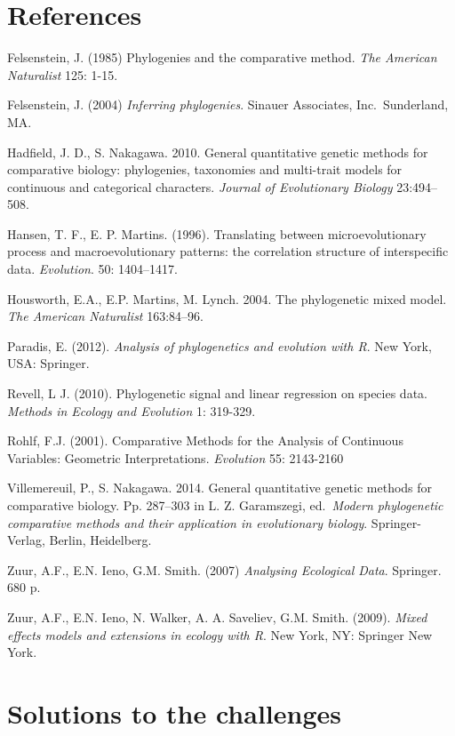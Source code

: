\documentclass[
]{book}
\begin{document}
\hypertarget{references}{%
\chapter{References}\label{references}}

Felsenstein, J. (1985) Phylogenies and the comparative method. \emph{The American Naturalist} 125: 1-15.

Felsenstein, J. (2004) \emph{Inferring phylogenies}. Sinauer Associates, Inc.~Sunderland, MA.

Hadfield, J. D., S. Nakagawa. 2010. General quantitative genetic methods for comparative biology: phylogenies, taxonomies and multi-trait models for continuous and categorical characters. \emph{Journal of Evolutionary Biology} 23:494--508.

Hansen, T. F., E. P. Martins. (1996). Translating between microevolutionary process and macroevolutionary patterns: the correlation structure of interspecific data. \emph{Evolution}. 50: 1404--1417.

Housworth, E.A., E.P. Martins, M. Lynch. 2004. The phylogenetic mixed model. \emph{The American Naturalist} 163:84--96.

Paradis, E. (2012). \emph{Analysis of phylogenetics and evolution with R}. New York, USA: Springer.

Revell, L J. (2010). Phylogenetic signal and linear regression on species data. \emph{Methods in Ecology and Evolution} 1: 319-329.

Rohlf, F.J. (2001). Comparative Methods for the Analysis of Continuous Variables: Geometric Interpretations. \emph{Evolution} 55: 2143-2160

Villemereuil, P., S. Nakagawa. 2014. General quantitative genetic methods for comparative biology. Pp. 287--303 in L. Z. Garamszegi, ed.~\emph{Modern phylogenetic comparative methods and their application in evolutionary biology}. Springer-Verlag, Berlin, Heidelberg.

Zuur, A.F., E.N. Ieno, G.M. Smith. (2007) \emph{Analysing Ecological Data}. Springer. 680 p.

Zuur, A.F., E.N. Ieno, N. Walker, A. A. Saveliev, G.M. Smith. (2009). \emph{Mixed effects models and extensions in ecology with R}. New York, NY: Springer New York.

\hypertarget{solutions}{%
\chapter{Solutions to the challenges}\label{solutions}}
\end{document}
